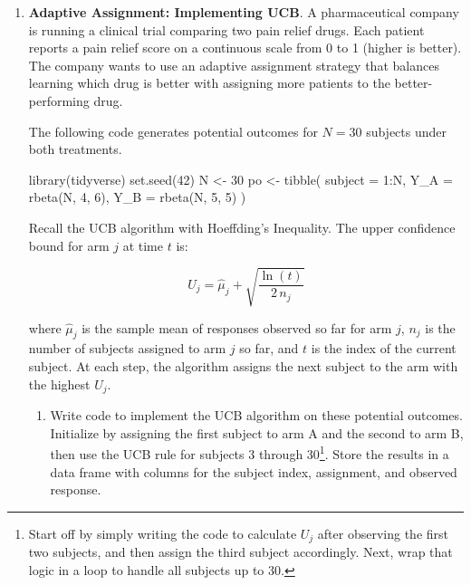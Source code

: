\documentclass[
  letterpaper,
  DIV=11,
  numbers=noendperiod]{scrartcl}
\newenvironment{Shaded}{\begin{snugshade}}{\end{snugshade}}
\newcommand{\AttributeTok}[1]{\textcolor[rgb]{0.40,0.45,0.13}{#1}}
\newcommand{\DecValTok}[1]{\textcolor[rgb]{0.68,0.00,0.00}{#1}}
\newcommand{\FunctionTok}[1]{\textcolor[rgb]{0.28,0.35,0.67}{#1}}
\newcommand{\NormalTok}[1]{\textcolor[rgb]{0.00,0.23,0.31}{#1}}
\newcommand{\OtherTok}[1]{\textcolor[rgb]{0.00,0.23,0.31}{#1}}
\newcommand{\SpecialCharTok}[1]{\textcolor[rgb]{0.37,0.37,0.37}{#1}}
\providecommand{\tightlist}{%
  \setlength{\itemsep}{0pt}\setlength{\parskip}{0pt}}
\begin{document}
\begin{enumerate}
\def\labelenumi{\arabic{enumi}.}
\setcounter{enumi}{4}
\item
  \textbf{Adaptive Assignment: Implementing UCB}. A pharmaceutical
  company is running a clinical trial comparing two pain relief drugs.
  Each patient reports a pain relief score on a continuous scale from 0
  to 1 (higher is better). The company wants to use an adaptive
  assignment strategy that balances learning which drug is better with
  assigning more patients to the better-performing drug.

  The following code generates potential outcomes for \(N = 30\)
  subjects under both treatments.

\begin{Shaded}
\begin{Highlighting}[]
\FunctionTok{library}\NormalTok{(tidyverse)}
\FunctionTok{set.seed}\NormalTok{(}\DecValTok{42}\NormalTok{)}
\NormalTok{N }\OtherTok{\textless{}{-}} \DecValTok{30}
\NormalTok{po }\OtherTok{\textless{}{-}} \FunctionTok{tibble}\NormalTok{(}
  \AttributeTok{subject =} \DecValTok{1}\SpecialCharTok{:}\NormalTok{N,}
  \AttributeTok{Y\_A =} \FunctionTok{rbeta}\NormalTok{(N, }\DecValTok{4}\NormalTok{, }\DecValTok{6}\NormalTok{),}
  \AttributeTok{Y\_B =} \FunctionTok{rbeta}\NormalTok{(N, }\DecValTok{5}\NormalTok{, }\DecValTok{5}\NormalTok{)}
\NormalTok{)}
\end{Highlighting}
\end{Shaded}

  Recall the UCB algorithm with Hoeffding's Inequality. The upper
  confidence bound for arm \(j\) at time \(t\) is:

  \[
  U_j = \hat{\mu}_j + \sqrt{\frac{\ln(t)}{2\, n_j}}
  \]

  where \(\hat{\mu}_j\) is the sample mean of responses observed so far
  for arm \(j\), \(n_j\) is the number of subjects assigned to arm \(j\)
  so far, and \(t\) is the index of the current subject. At each step,
  the algorithm assigns the next subject to the arm with the highest
  \(U_j\).

  \begin{enumerate}
  \def\labelenumii{\alph{enumii}.}
  \tightlist
  \item
    Write code to implement the UCB algorithm on these potential
    outcomes. Initialize by assigning the first subject to arm A and the
    second to arm B, then use the UCB rule for subjects 3 through
    30\footnote{Start off by simply writing the code to calculate
      \(U_j\) after observing the first two subjects, and then assign
      the third subject accordingly. Next, wrap that logic in a loop to
      handle all subjects up to 30.}. Store the results in a data frame
    with columns for the subject index, assignment, and observed
    response.
  \end{enumerate}


\end{enumerate}
\end{document}

